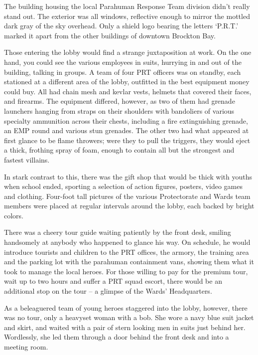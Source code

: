 





The building housing the local Parahuman Response Team division didn't really stand out. The exterior was all windows, reflective enough to mirror the mottled dark gray of the sky overhead.  Only a shield logo bearing the letters `P.R.T.' marked it apart from the other buildings of downtown Brockton Bay.



Those entering the lobby would find a strange juxtaposition at work.  On the one hand, you could see the various employees in suits, hurrying in and out of the building, talking in groups.  A team of four PRT officers was on standby, each stationed at a different area of the lobby, outfitted in the best equipment money could buy.  All had chain mesh and kevlar vests, helmets that covered their faces, and firearms.  The equipment differed, however, as two of them had grenade launchers hanging from straps on their shoulders with bandoliers of various specialty ammunition across their chests, including a fire extinguishing grenade, an EMP round and various stun grenades.  The other two had what appeared at first glance to be flame throwers; were they to pull the triggers, they would eject a thick, frothing spray of foam, enough to contain all but the strongest and fastest villains.



In stark contrast to this, there was the gift shop that would be thick with youths when school ended, sporting a selection of action figures, posters, video games and clothing.  Four-foot tall pictures of the various Protectorate and Wards team members were placed at regular intervals around the lobby, each backed by bright colors.



There was a cheery tour guide waiting patiently by the front desk, smiling handsomely at anybody who happened to glance his way.  On schedule, he would introduce tourists and children to the PRT offices, the armory, the training area and the parking lot with the parahuman containment vans, showing them what it took to manage the local heroes.  For those willing to pay for the premium tour, wait up to two hours and suffer a PRT squad escort, there would be an additional stop on the tour – a glimpse of the Wards' Headquarters.



As a beleaguered team of young heroes staggered into the lobby, however, there was no tour, only a heavyset woman with a bob.  She wore a navy blue suit jacket and skirt, and waited with a pair of stern looking men in suits just behind her.  Wordlessly, she led them through a door behind the front desk and into a meeting room.




